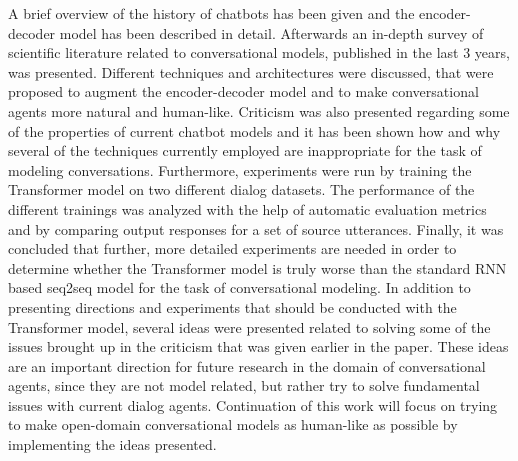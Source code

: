 \documentclass[12pt]{article}
\begin{document}
A brief overview of the history of chatbots has been given and the encoder-decoder model has been described in detail. Afterwards an in-depth survey of scientific literature related to conversational models, published in the last 3 years, was presented. Different techniques and architectures were discussed, that were proposed to augment the encoder-decoder model and to make conversational agents more natural and human-like. Criticism was also presented regarding some of the properties of current chatbot models and it has been shown how and why several of the techniques currently employed are inappropriate for the task of modeling conversations. Furthermore, experiments were run by training the Transformer model on two different dialog datasets. The performance of the different trainings was analyzed with the help of automatic evaluation metrics and by comparing output responses for a set of source utterances. Finally, it was concluded that further, more detailed experiments are needed in order to determine whether the Transformer model is truly worse than the standard RNN based seq2seq model for the task of conversational modeling. In addition to presenting directions and experiments that should be conducted with the Transformer model, several ideas were presented related to solving some of the issues brought up in the criticism that was given earlier in the paper. These ideas are an important direction for future research in the domain of conversational agents, since they are not model related, but rather try to solve fundamental issues with current dialog agents. Continuation of this work will focus on trying to make open-domain conversational models as human-like as possible by implementing the ideas presented.



\newpage
\end{document}
